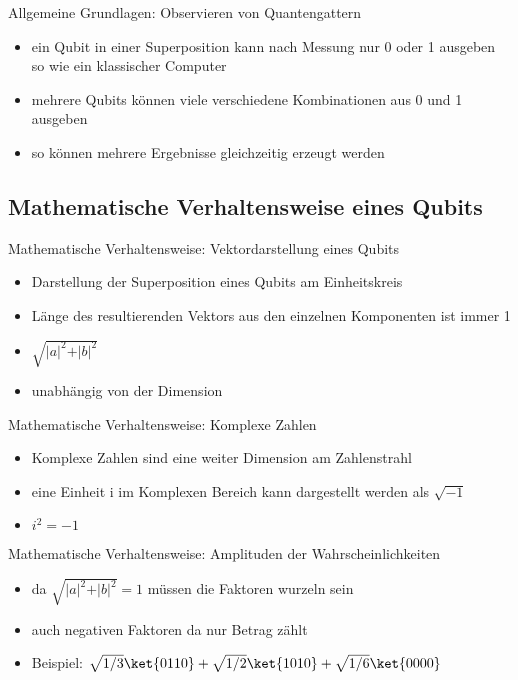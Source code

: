 \documentclass[]{beamer}
\begin{document}
\begin{frame}{Allgemeine Grundlagen: Observieren von Quantengattern}
\begin{center} %
	\begin{itemize}
	\item ein Qubit in einer Superposition kann nach Messung nur 0 oder 1 ausgeben so wie ein klassischer Computer
    \item mehrere Qubits können viele verschiedene Kombinationen aus 0 und 1 ausgeben
    \item so können mehrere Ergebnisse gleichzeitig erzeugt werden
\end{itemize}
\end{center}
\end{frame}

\subsection{Mathematische Verhaltensweise eines Qubits}
\begin{frame}{Mathematische Verhaltensweise: Vektordarstellung eines Qubits}%
\begin{center}
	\begin{itemize}
 \item Darstellung der Superposition eines Qubits am Einheitskreis
 \item Länge des resultierenden Vektors aus den einzelnen Komponenten ist immer 1
 \item $\sqrt{\vert a \vert^2 +\vert b\vert^2}$
 \item unabhängig von der Dimension
\end{itemize}
\end{center}
\end{frame}

\begin{frame}{Mathematische Verhaltensweise: Komplexe Zahlen}%
\begin{center}
\begin{itemize}
	\item Komplexe Zahlen sind eine weiter Dimension am Zahlenstrahl
    \item eine Einheit i im Komplexen Bereich kann dargestellt werden als $\sqrt{-1}$
    \item $i^2 = -1$
\end{itemize}
\end{center}
\end{frame}

\begin{frame}{Mathematische Verhaltensweise: Amplituden der Wahrscheinlichkeiten}%
\begin{center}
	\begin{itemize}
	\item da $\sqrt{\vert a\vert^2 + \vert b\vert^2} = 1$ müssen die Faktoren wurzeln sein
    \item auch negativen Faktoren da nur Betrag zählt
    \item Beispiel: $\sqrt{1/3} \ket{0110} + \sqrt{1/2} \ket{1010} + \sqrt{1/6} \ket{0000}$
\end{itemize}
\end{center}
\end{frame}
\end{document}
